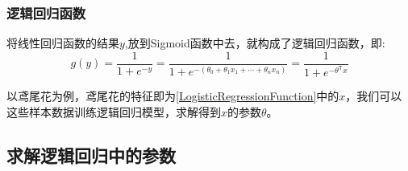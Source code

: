 \documentclass[UTF8]{article}
\begin{document}
\subsubsection{逻辑回归函数}
将线性回归函数的结果$y$,放到Sigmoid函数中去，就构成了逻辑回归函数，即:
\begin{equation}
	g(y)=\frac{1}{1+e^{-y}}	=\frac{1}{1+e^{-(\theta_0+\theta_1 x_1+\cdots+\theta_n x_n)}}
	=\frac{1}{1+e^{-\theta^\mathsf{T}x}} \label{LogisticRegressionFunction}
\end{equation}
\par
以鸢尾花为例，鸢尾花的特征即为\eqref{LogisticRegressionFunction}中的$x$，我们可以
这些样本数据训练逻辑回归模型，求解得到$x$的参数$\theta$。

\subsection{求解逻辑回归中的参数}
\end{document}
